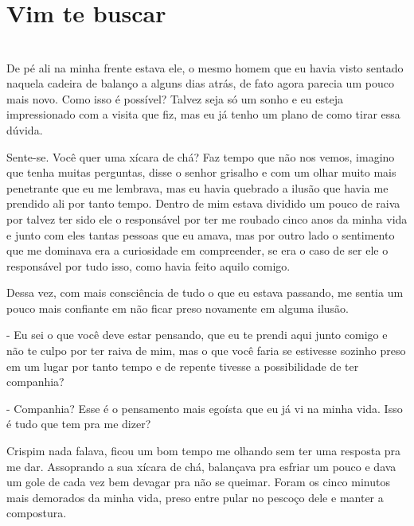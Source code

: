
\newpage

\ifdefined\useChapters
\chapter{Vim te buscar}
\else
\chapter{}
\fi


De pé ali na minha frente estava ele, o mesmo homem que eu havia visto sentado naquela cadeira de balanço a alguns dias atrás, de fato agora parecia um pouco mais novo. Como isso é possível? Talvez seja só um sonho e eu esteja impressionado com a visita que fiz, mas eu já tenho um plano de como tirar essa dúvida.

Sente-se. Você quer uma xícara de chá? Faz tempo que não nos vemos, imagino que tenha muitas perguntas, disse o senhor grisalho e com um olhar muito mais penetrante que eu me lembrava, mas eu havia quebrado a ilusão que havia me prendido ali por tanto tempo. Dentro de mim estava dividido um pouco de raiva por talvez ter sido ele o responsável por ter me roubado cinco anos da minha vida e junto com eles tantas pessoas que eu amava, mas por outro lado o sentimento que me dominava era a curiosidade em compreender, se era o caso de ser ele o responsável por tudo isso, como havia feito aquilo comigo.

Dessa vez, com mais consciência de tudo o que eu estava passando, me sentia um pouco mais confiante em não ficar preso novamente em alguma ilusão.

- Eu sei o que você deve estar pensando, que eu te prendi aqui junto comigo e não te culpo por ter raiva de mim, mas o que você faria se estivesse sozinho preso em um lugar por tanto tempo e de repente tivesse a possibilidade de ter companhia?

- Companhia? Esse é o pensamento mais egoísta que eu já vi na minha vida. Isso é tudo que tem pra me dizer?

Crispim nada falava, ficou um bom tempo me olhando sem ter uma resposta pra me dar. Assoprando a sua xícara de chá, balançava pra esfriar um pouco e dava um gole de cada vez bem devagar pra não se queimar. Foram os cinco minutos mais demorados da minha vida, preso entre pular no pescoço dele e manter a compostura.

